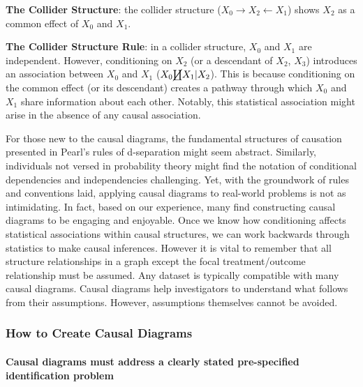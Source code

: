\documentclass[
  singlecolumn]{article}
\let\oldparagraph\paragraph
\renewcommand{\paragraph}[1]{\oldparagraph{#1}\mbox{}}
\begin{document}
\textbf{The Collider Structure}: the collider structure
(\(X_0 \rightarrow X_2 \leftarrow X_1\)) shows \(X_2\) as a common
effect of \(X_0\) and \(X_1\).

\textbf{The Collider Structure Rule}: in a collider structure, \(X_0\)
and \(X_1\) are independent. However, conditioning on \(X_2\) (or a
descendant of \(X_2\), \(X_3\)) introduces an association between
\(X_0\) and \(X_1\) (\(X_0 \cancel\coprod X_1 | X_2\)). This is because
conditioning on the common effect (or its descendant) creates a pathway
through which \(X_0\) and \(X_1\) share information about each other.
Notably, this statistical association might arise in the absence of any
causal association.

For those new to the causal diagrams, the fundamental structures of
causation presented in Pearl's rules of d-separation might seem
abstract. Similarly, individuals not versed in probability theory might
find the notation of conditional dependencies and independencies
challenging. Yet, with the groundwork of rules and conventions laid,
applying causal diagrams to real-world problems is not as intimidating.
In fact, based on our experience, many find constructing causal diagrams
to be engaging and enjoyable. Once we know how conditioning affects
statistical associations within causal structures, we can work backwards
through statistics to make causal inferences. However it is vital to
remember that all structure relationships in a graph except the focal
treatment/outcome relationship must be assumed. Any dataset is typically
compatible with many causal diagrams. Causal diagrams help investigators
to understand what follows from their assumptions. However, assumptions
themselves cannot be avoided.

\subsubsection{How to Create Causal
Diagrams}\label{how-to-create-causal-diagrams}

\paragraph{Causal diagrams must address a clearly stated pre-specified
identification
problem}\label{causal-diagrams-must-address-a-clearly-stated-pre-specified-identification-problem}
\end{document}
